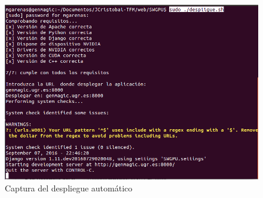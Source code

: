 \bigskip
\begin{figure}[h]
	\centering
	\includegraphics[width=1\linewidth]{../images/prueba_despliegue}
	\caption[Captura del despliegue automático]{Captura del despliegue automático}
	\label{fig:prueba_despliegue}
\end{figure}


